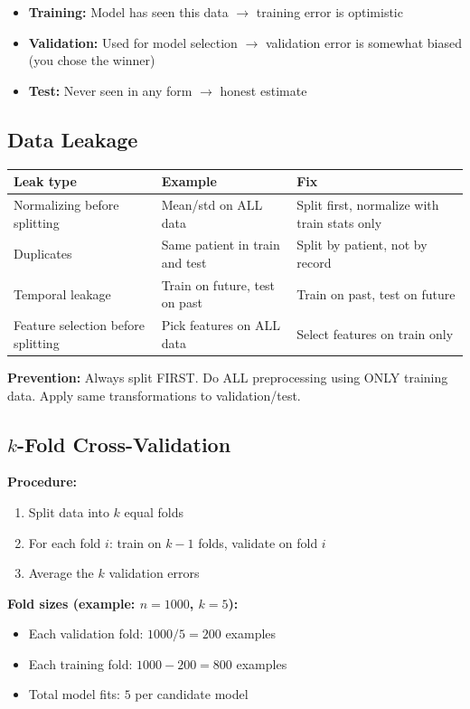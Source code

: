 \documentclass[11pt,a4paper]{article}
\begin{document}
\begin{itemize}
    \item \textbf{Training:} Model has seen this data $\to$ training error is optimistic
    \item \textbf{Validation:} Used for model selection $\to$ validation error is somewhat biased (you chose the winner)
    \item \textbf{Test:} Never seen in any form $\to$ honest estimate
\end{itemize}

\subsection{Data Leakage}

\begin{center}
\begin{tabular}{|l|l|l|}
\hline
\textbf{Leak type} & \textbf{Example} & \textbf{Fix} \\
\hline
Normalizing before splitting & Mean/std on ALL data & Split first, normalize with train stats only \\
Duplicates & Same patient in train and test & Split by patient, not by record \\
Temporal leakage & Train on future, test on past & Train on past, test on future \\
Feature selection before splitting & Pick features on ALL data & Select features on train only \\
\hline
\end{tabular}
\end{center}

\textbf{Prevention:} Always split FIRST. Do ALL preprocessing using ONLY training data. Apply same transformations to validation/test.

\subsection{$k$-Fold Cross-Validation}

\textbf{Procedure:}
\begin{enumerate}
    \item Split data into $k$ equal folds
    \item For each fold $i$: train on $k-1$ folds, validate on fold $i$
    \item Average the $k$ validation errors
\end{enumerate}

\textbf{Fold sizes (example: $n=1000$, $k=5$):}
\begin{itemize}
    \item Each validation fold: $1000/5 = 200$ examples
    \item Each training fold: $1000 - 200 = 800$ examples
    \item Total model fits: $5$ per candidate model
\end{itemize}
\end{document}

